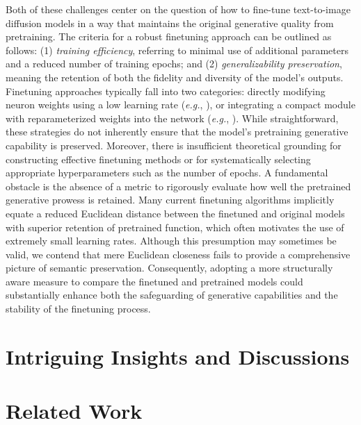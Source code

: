 Both of these challenges center on the question of how to fine-tune text-to-image diffusion models in a way that maintains the original generative quality from pretraining. The criteria for a robust finetuning approach can be outlined as follows: (1) \emph{training efficiency}, referring to minimal use of additional parameters and a reduced number of training epochs; and (2) \emph{generalizability preservation}, meaning the retention of both the fidelity and diversity of the model’s outputs. Finetuning approaches typically fall into two categories: directly modifying neuron weights using a low learning rate (\emph{e.g.}, \cite{ruiz2023dreambooth}), or integrating a compact module with reparameterized weights into the network (\emph{e.g.}, \cite{hulora2022,zhang2023adding}). While straightforward, these strategies do not inherently ensure that the model’s pretraining generative capability is preserved. Moreover, there is insufficient theoretical grounding for constructing effective finetuning methods or for systematically selecting appropriate hyperparameters such as the number of epochs. A fundamental obstacle is the absence of a metric to rigorously evaluate how well the pretrained generative prowess is retained. Many current finetuning algorithms implicitly equate a reduced Euclidean distance between the finetuned and original models with superior retention of pretrained function, which often motivates the use of extremely small learning rates. Although this presumption may sometimes be valid, we contend that mere Euclidean closeness fails to provide a comprehensive picture of semantic preservation. Consequently, adopting a more structurally aware measure to compare the finetuned and pretrained models could substantially enhance both the safeguarding of generative capabilities and the stability of the finetuning process.

\section{Intriguing Insights and Discussions}

\section{Related Work}

